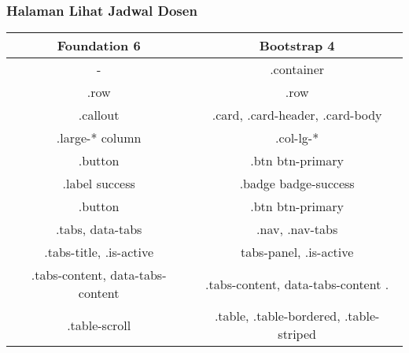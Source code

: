 \subsubsection{Halaman Lihat Jadwal Dosen}
\begin{tabular}{|c|c|} 
	\hline
	\textbf{Foundation 6} & \textbf{Bootstrap 4}  \\ [0.5ex] 
	\hline\hline
	- &   .container\\ 
	\hline	
	.row &  .row\\
	\hline	
	.callout &  .card, .card-header, .card-body \\
	\hline	
	.large-* column &  .col-lg-* \\
	\hline	
	.button &  .btn btn-primary\\
	\hline	
	.label success &  .badge badge-success \\	
	\hline	
	.button & .btn btn-primary  \\
	\hline	
	.tabs, data-tabs & .nav, .nav-tabs\\	
	\hline	
	.tabs-title, .is-active &  tabs-panel, .is-active \\
	\hline
	.tabs-content, data-tabs-content & .tabs-content, data-tabs-content . \\
	\hline	
	.table-scroll & .table, .table-bordered, .table-striped \\[1ex] 
	\hline 
\end{tabular}






